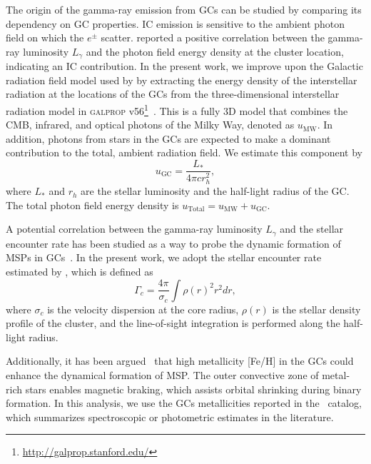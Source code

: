 \documentclass[doublespace,nopageskip]{VTthesis} %
\begin{document}
The origin of the gamma-ray emission from GCs can be studied by comparing its dependency on GC properties. IC emission is sensitive to the ambient photon field on which the $e^\pm$ scatter. \citet{2011ApJ...726..100H} reported a positive correlation between the gamma-ray luminosity $L_\gamma$ and the photon field energy density at the cluster location, indicating an IC contribution. In the present work, we improve upon the Galactic radiation field model used by \citet{2011ApJ...726..100H} by extracting the energy density of the interstellar radiation at the locations of the GCs from the three-dimensional interstellar radiation model in \textsc{galprop} v56\footnote{\url{http://galprop.stanford.edu/}}~\citep{2017ApJ...846...67P,2018ApJ...856...45J}. This is a fully 3D model that combines the CMB, infrared, and optical photons of the Milky Way, denoted as $u_\text{MW}$. In addition, photons from stars in the GCs are expected to make a dominant contribution to the total, ambient radiation field. We estimate this component by
\begin{equation}
    u_{\text{GC}} = \dfrac{L_*}{4\pi c r_h^2},
    \label{eq:GCRF}
\end{equation}
where $L_*$ and $r_h$ are the stellar luminosity and the half-light radius of the GC. The total photon field energy density is $u_\text{Total} = u_\text{MW} + u_\text{GC}$.

A potential correlation between the gamma-ray luminosity $L_\gamma$ and the stellar encounter rate has been studied as a way to probe the dynamic formation of MSPs in GCs~\citep{2010A&A...524A..75A,2011ApJ...726..100H,2019MNRAS.486..851D}. In the present work, we adopt the stellar encounter rate estimated by \citet{2013ApJ...766..136B}, which is defined as
\begin{equation}
    \Gamma_c = \frac{4\pi}{\sigma_c}\int\rho(r)^2 r^2dr,
	\label{eq:encounter}
\end{equation}
where $\sigma_c$ is the velocity dispersion at the core radius, $\rho(r)$ is the stellar density profile of the cluster, and the line-of-sight integration is performed along the half-light radius. 

Additionally, it has been argued~\citep{2011ApJ...726..100H,2019MNRAS.486..851D} that high metallicity [Fe/H] in the GCs could enhance the dynamical formation of MSP. The outer convective zone of metal-rich stars enables magnetic braking, which assists orbital shrinking during binary formation. In this analysis, we use the GCs metallicities  reported in the~\citet{1996AJ....112.1487H} catalog, which summarizes  spectroscopic or photometric estimates in the literature.
\end{document}
